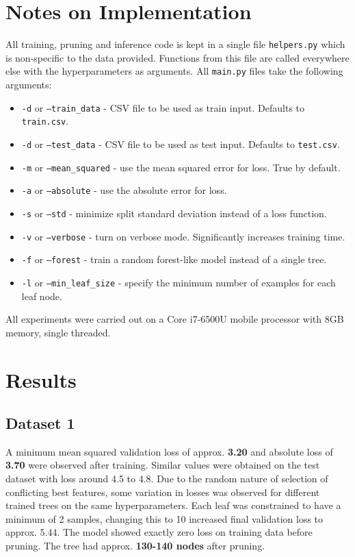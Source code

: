 \documentclass{article}
\begin{document}
\section{Notes on Implementation}
All training, pruning and inference code is kept in a single file \texttt{helpers.py} which is non-specific to the data provided. Functions from this file are called everywhere else with the hyperparameters as arguments. All \texttt{main.py} files take the following arguments:
\begin{itemize}
	\item \texttt{-d} or \texttt{--train\_data}
	- CSV file to be used as train input. Defaults to \texttt{train.csv}.
	\item \texttt{-d} or \texttt{--test\_data}
	- CSV file to be used as test input. Defaults to \texttt{test.csv}.
	\item \texttt{-m} or \texttt{--mean\_squared}
	- use the mean squared error for loss. True by default.
	\item \texttt{-a} or \texttt{--absolute}
	- use the absolute error for loss.
	\item \texttt{-s} or \texttt{--std}
	- minimize split standard deviation instead of a loss function.
	\item \texttt{-v} or \texttt{--verbose}
	- turn on verbose mode. Significantly increases training time.
	\item \texttt{-f} or \texttt{--forest}
	- train a random forest-like model instead of a single tree.
	\item \texttt{-l} or \texttt{--min\_leaf\_size}
	- specify the minimum number of examples for each leaf node.
\end{itemize}

All experiments were carried out on a Core i7-6500U mobile processor with 8GB memory, single threaded.

\newpage

\section{Results}
\subsection{Dataset 1}
A minimum mean squared validation loss of approx. \textbf{3.20} and absolute loss of \textbf{3.70} were observed after training. Similar values were obtained on the test dataset with loss around 4.5 to 4.8. Due to the random nature of selection of conflicting best features, some variation in losses was observed for different trained trees on the same hyperparameters. Each leaf was constrained to have a minimum of 2 samples, changing this to 10 increased final validation loss to approx. 5.44. The model showed exactly zero loss on training data before pruning. The tree had approx. \textbf{130-140 nodes} after pruning.
\end{document}
